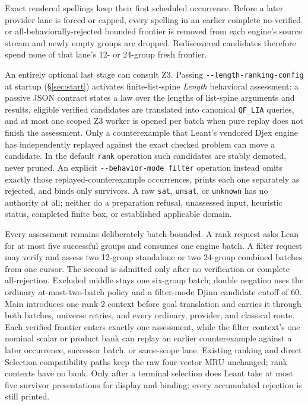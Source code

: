 \documentclass[11pt,oneside]{article}
\newcommand{\code}[1]{\texttt{#1}}
\begin{document}
Exact rendered spellings keep their first scheduled occurrence. Before a
later provider lane is forced or capped, every spelling in an earlier complete
no-verified or all-behaviorally-rejected bounded frontier is removed from each
engine's source stream and newly empty groups are dropped. Rediscovered
candidates therefore spend none of that lane's 12- or 24-group fresh frontier.

An entirely optional last stage can consult Z3.  Passing
\code{-{}-length-ranking-config} at startup (\S\ref{sec:start}) activates
finite-list-spine \emph{Length} behavioral assessment: a passive
JSON contract states a law over the lengths of list-spine arguments and
results, eligible verified candidates are translated into canonical
\code{QF\_LIA} queries, and at most one scoped Z3 worker is opened per
batch when pure replay does not finish the assessment. Only a counterexample
that Leant's vendored Djex engine has
independently replayed against the exact checked problem can move a
candidate. In the default \code{rank} operation such candidates are stably
demoted, never pruned. An explicit \code{-{}-behavior-mode filter} operation
instead omits exactly those replayed-counterexample occurrences, prints each
one separately as rejected, and binds only survivors. A raw \code{sat},
\code{unsat}, or \code{unknown} has no authority at all; neither do a
preparation refusal, unassessed input, heuristic status, completed finite box,
or established applicable domain.

Every assessment remains deliberately batch-bounded. A rank request asks Lean
for at most five successful groups and consumes one engine batch. A filter
request may verify and assess two 12-group standalone or two 24-group combined
batches from one cursor. The second is admitted only after no verification or
complete all-rejection. Excluded middle stays one six-group batch; double
negation uses the ordinary at-most-two-batch policy and a filter-mode Djinn
candidate cutoff of 60. Main introduces one rank-2 context before goal
translation and carries it through both batches, universe retries, and every
ordinary, provider, and classical route. Each verified frontier enters exactly
one assessment, while the filter context's one nominal scalar or product bank
can replay an earlier counterexample against a later occurrence, successor
batch, or same-scope lane. Existing ranking and direct Selection
compatibility paths keep the raw four-vector MRU unchanged; rank contexts have
no bank. Only after a terminal selection does Leant take at most five survivor
presentations for display and binding; every accumulated rejection is still
printed.
\end{document}
